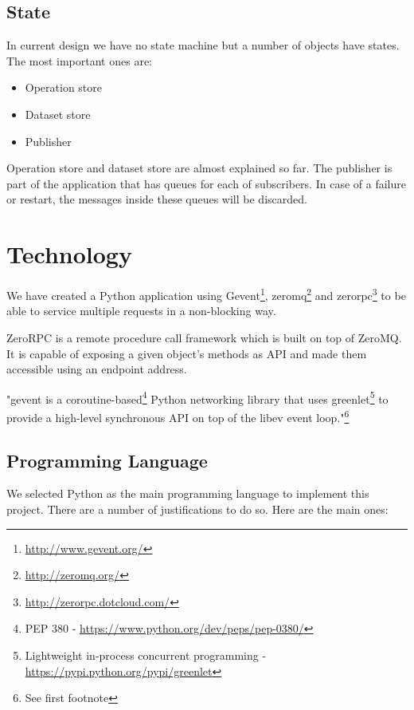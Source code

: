 \subsection{State}
In current design we have no state machine but a number of objects have states.
The most important ones are:
\begin{itemize}
\item Operation store
\item Dataset store
\item Publisher
\end{itemize}

Operation store and dataset store are almost explained so far. 
The publisher is part of the application that has queues for each of subscribers.
In case of a failure or restart, the messages inside these queues will be discarded.

\section{Technology}
We have created a Python application using Gevent\footnote{\url{http://www.gevent.org/}},
zeromq\footnote{\url{http://zeromq.org/}} and zerorpc\footnote{\url{http://zerorpc.dotcloud.com/}} 
to be able to service multiple requests in a non-blocking way.

ZeroRPC is a remote procedure call framework which is built on top of ZeroMQ.
It is capable of exposing a given object's methods as API and made them accessible using an endpoint address.

"gevent is a coroutine-based\footnote{PEP 380 - \url{https://www.python.org/dev/peps/pep-0380/}}
Python networking library that 
uses greenlet\footnote{Lightweight in-process concurrent programming - \url{https://pypi.python.org/pypi/greenlet}} 
to provide a high-level synchronous API on top of the libev event loop."\footnote{See first footnote}


\subsection{Programming Language}
We selected Python as the main programming language to implement this project. 
There are a number of justifications to do so. Here are the main ones:

